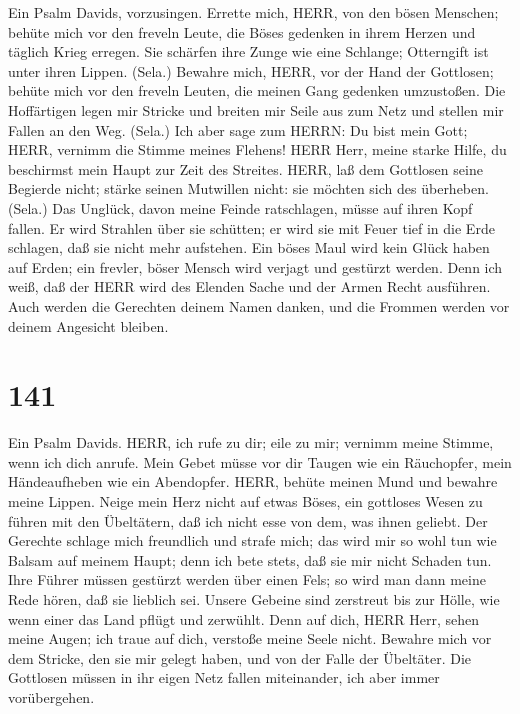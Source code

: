  Ein Psalm Davids, vorzusingen. Errette mich, HERR, von den
bösen Menschen; behüte mich vor den freveln Leute,  die
Böses gedenken in ihrem Herzen und täglich Krieg erregen. 
Sie schärfen ihre Zunge wie eine Schlange; Otterngift ist unter ihren
Lippen. (Sela.)  Bewahre mich, HERR, vor der Hand der
Gottlosen; behüte mich vor den freveln Leuten, die meinen Gang gedenken
umzustoßen.  Die Hoffärtigen legen mir Stricke und breiten
mir Seile aus zum Netz und stellen mir Fallen an den Weg. (Sela.)
 Ich aber sage zum HERRN: Du bist mein Gott; HERR, vernimm
die Stimme meines Flehens!  HERR Herr, meine starke Hilfe,
du beschirmst mein Haupt zur Zeit des Streites.  HERR, laß
dem Gottlosen seine Begierde nicht; stärke seinen Mutwillen nicht: sie
möchten sich des überheben. (Sela.)  Das Unglück, davon
meine Feinde ratschlagen, müsse auf ihren Kopf fallen.  Er
wird Strahlen über sie schütten; er wird sie mit Feuer tief in die Erde
schlagen, daß sie nicht mehr aufstehen.  Ein böses Maul
wird kein Glück haben auf Erden; ein frevler, böser Mensch wird verjagt
und gestürzt werden.  Denn ich weiß, daß der HERR wird des
Elenden Sache und der Armen Recht ausführen.  Auch werden
die Gerechten deinem Namen danken, und die Frommen werden vor deinem
Angesicht bleiben.

\hypertarget{section-140}{%
\section{141}\label{section-140}}

 Ein Psalm Davids. HERR, ich rufe zu dir; eile zu mir;
vernimm meine Stimme, wenn ich dich anrufe.  Mein Gebet
müsse vor dir Taugen wie ein Räuchopfer, mein Händeaufheben wie ein
Abendopfer.  HERR, behüte meinen Mund und bewahre meine
Lippen.  Neige mein Herz nicht auf etwas Böses, ein
gottloses Wesen zu führen mit den Übeltätern, daß ich nicht esse von
dem, was ihnen geliebt.  Der Gerechte schlage mich
freundlich und strafe mich; das wird mir so wohl tun wie Balsam auf
meinem Haupt; denn ich bete stets, daß sie mir nicht Schaden tun.
 Ihre Führer müssen gestürzt werden über einen Fels; so wird
man dann meine Rede hören, daß sie lieblich sei.  Unsere
Gebeine sind zerstreut bis zur Hölle, wie wenn einer das Land pflügt und
zerwühlt.  Denn auf dich, HERR Herr, sehen meine Augen; ich
traue auf dich, verstoße meine Seele nicht.  Bewahre mich
vor dem Stricke, den sie mir gelegt haben, und von der Falle der
Übeltäter.  Die Gottlosen müssen in ihr eigen Netz fallen
miteinander, ich aber immer vorübergehen.

